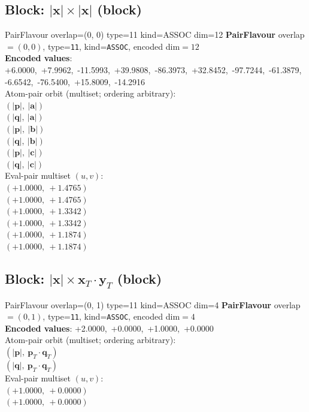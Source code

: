\documentclass[a4paper,11pt]{article}
\newcommand{\vc}[1]{\ensuremath{\mathbf{#1}}}
\newcommand{\dnfagmiihhiejm}[1]{|\vc{#1}|}
\newcommand{\fpbeomcfokjooi}[2]{\mathbf{#1}_T \cdot \mathbf{#2}_T}
\begin{document}
\subsection{Block: $\dnfagmiihhiejm{x} \times \dnfagmiihhiejm{x}$  (block)}
    PairFlavour  overlap=(0, 0)  type=11  kind=ASSOC  dim=12
\textbf{PairFlavour} overlap$=(0, 0)$, type=\texttt{11}, kind=\texttt{ASSOC}, encoded dim$=12$\\
\textbf{      Encoded values}: +6.0000,\ +7.9962,\ -11.5993,\ +39.9808,\ -86.3973,\ +32.8452,\ -97.7244,\ -61.3879,\ -6.6542,\ -76.5400,\ +15.8009,\ -14.2916\\
\quad Atom-pair orbit (multiset; ordering arbitrary):\\
$(\dnfagmiihhiejm{p},\ \dnfagmiihhiejm{a})$\\
$(\dnfagmiihhiejm{q},\ \dnfagmiihhiejm{a})$\\
$(\dnfagmiihhiejm{p},\ \dnfagmiihhiejm{b})$\\
$(\dnfagmiihhiejm{q},\ \dnfagmiihhiejm{b})$\\
$(\dnfagmiihhiejm{p},\ \dnfagmiihhiejm{c})$\\
$(\dnfagmiihhiejm{q},\ \dnfagmiihhiejm{c})$\\
\quad Eval-pair multiset $(u, v)$:\\
$(+1.0000,\ +1.4765)$\\
$(+1.0000,\ +1.4765)$\\
$(+1.0000,\ +1.3342)$\\
$(+1.0000,\ +1.3342)$\\
$(+1.0000,\ +1.1874)$\\
$(+1.0000,\ +1.1874)$\\

\subsection{Block: $\dnfagmiihhiejm{x} \times \fpbeomcfokjooi{x}{y}$  (block)}
    PairFlavour  overlap=(0, 1)  type=11  kind=ASSOC  dim=4
\textbf{PairFlavour} overlap$=(0, 1)$, type=\texttt{11}, kind=\texttt{ASSOC}, encoded dim$=4$\\
\textbf{      Encoded values}: +2.0000,\ +0.0000,\ +1.0000,\ +0.0000\\
\quad Atom-pair orbit (multiset; ordering arbitrary):\\
$(\dnfagmiihhiejm{p},\ \fpbeomcfokjooi{p}{q})$\\
$(\dnfagmiihhiejm{q},\ \fpbeomcfokjooi{p}{q})$\\
\quad Eval-pair multiset $(u, v)$:\\
$(+1.0000,\ +0.0000)$\\
$(+1.0000,\ +0.0000)$\\
\end{document}
